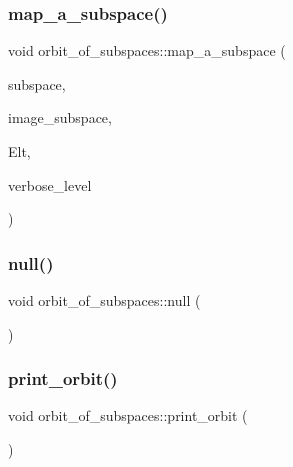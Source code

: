 \subsubsection{\texorpdfstring{map\+\_\+a\+\_\+subspace()}{map\_a\_subspace()}}
{\footnotesize\ttfamily void orbit\+\_\+of\+\_\+subspaces\+::map\+\_\+a\+\_\+subspace (\begin{DoxyParamCaption}\item[{\mbox{\hyperlink{galois_8h_a09fddde158a3a20bd2dcadb609de11dc}{I\+NT}} $\ast$}]{subspace,  }\item[{\mbox{\hyperlink{galois_8h_a09fddde158a3a20bd2dcadb609de11dc}{I\+NT}} $\ast$}]{image\+\_\+subspace,  }\item[{\mbox{\hyperlink{galois_8h_a09fddde158a3a20bd2dcadb609de11dc}{I\+NT}} $\ast$}]{Elt,  }\item[{\mbox{\hyperlink{galois_8h_a09fddde158a3a20bd2dcadb609de11dc}{I\+NT}}}]{verbose\+\_\+level }\end{DoxyParamCaption})}

\mbox{\label{classorbit__of__subspaces_a2171f35b76e2c067abf69d07e2bce04b}} 
\subsubsection{\texorpdfstring{null()}{null()}}
{\footnotesize\ttfamily void orbit\+\_\+of\+\_\+subspaces\+::null (\begin{DoxyParamCaption}{ }\end{DoxyParamCaption})}

\mbox{\label{classorbit__of__subspaces_ab50f480e950d276898adbb081dde10bc}} 
\subsubsection{\texorpdfstring{print\+\_\+orbit()}{print\_orbit()}}
{\footnotesize\ttfamily void orbit\+\_\+of\+\_\+subspaces\+::print\+\_\+orbit (\begin{DoxyParamCaption}{ }\end{DoxyParamCaption})}

